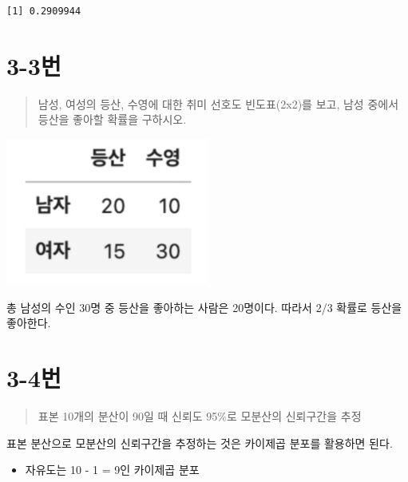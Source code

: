 \documentclass[
  letterpaper,
  DIV=11,
  numbers=noendperiod]{scrreprt}
\providecommand{\tightlist}{%
  \setlength{\itemsep}{0pt}\setlength{\parskip}{0pt}}\usepackage{longtable,booktabs,array}
\begin{document}
\begin{verbatim}
[1] 0.2909944
\end{verbatim}

\hypertarget{uxbc88-51}{%
\section*{3-3번}\label{uxbc88-51}}


\begin{quote}
남성, 여성의 등산, 수영에 대한 취미 선호도 빈도표(2x2)를 보고, 남성
중에서 등산을 좋아할 확률을 구하시오.
\end{quote}

\includegraphics[width=0.5\textwidth,height=\textheight]{./test/25/problem3_3.png}

총 남성의 수인 30명 중 등산을 좋아하는 사람은 20명이다. 따라서 2/3
확률로 등산을 좋아한다.

\hypertarget{uxbc88-52}{%
\section*{3-4번}\label{uxbc88-52}}


\begin{quote}
표본 10개의 분산이 90일 때 신뢰도 95\%로 모분산의 신뢰구간을 추정
\end{quote}

표본 분산으로 모분산의 신뢰구간을 추정하는 것은 카이제곱 분포를 활용하면
된다.

\begin{itemize}
\tightlist
\item
  자유도는 10 - 1 = 9인 카이제곱 분포
\end{itemize}
\end{document}
